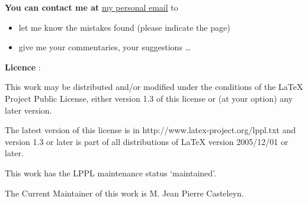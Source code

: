 %
\vspace{1cm}



{
\textbf{You can contact me at }
 \href{mailto:jpcdk@yahoo.fr}{my personal email} to

\begin{itemize}
\item let me know the mistakes found (please indicate the page)
\item give me your commentaries, your suggestions \dots
\end{itemize}}

\vspace{1cm}

\textbf{Licence } :


This work may be distributed and/or modified under the conditions of the LaTeX Project Public License, either version 1.3 of this license or (at your option) any later version.

 The latest version of this license is in  http://www.latex-project.org/lppl.txt and version 1.3 or later is part of all distributions of LaTeX
version 2005/12/01 or later.

This work has the LPPL maintenance status `maintained'.

The Current Maintainer of this work is M. Jean Pierre Casteleyn.

\vspace{2cm}

 
\newpage